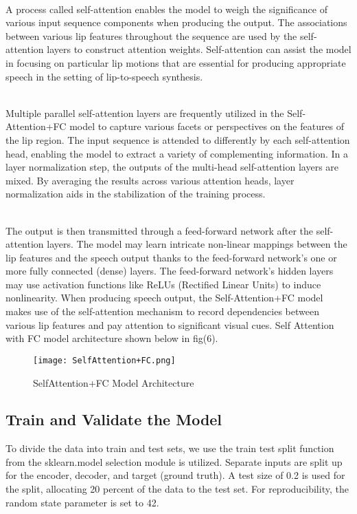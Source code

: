 \documentclass[conference]{IEEEtran}
\begin{document}
\\ A process called self-attention enables the model to weigh the significance of various input sequence components when producing the output.
The associations between various lip features throughout the sequence are used by the self-attention layers to construct attention weights. Self-attention can assist the model in focusing on particular lip motions that are essential for producing appropriate speech in the setting of lip-to-speech synthesis.

\\ Multiple parallel self-attention layers are frequently utilized in the Self-Attention+FC model to capture various facets or perspectives on the features of the lip region. The input sequence is attended to differently by each self-attention head, enabling the model to extract a variety of complementing information. In a layer normalization step, the outputs of the multi-head self-attention layers are mixed. By averaging the results across various attention heads, layer normalization aids in the stabilization of the training process.

\\ The output is then transmitted through a feed-forward network after the self-attention layers. The model may learn intricate non-linear mappings between the lip features and the speech output thanks to the feed-forward network's one or more fully connected (dense) layers. The feed-forward network's hidden layers may use activation functions like ReLUs (Rectified Linear Units) to induce nonlinearity. When producing speech output, the Self-Attention+FC model makes use of the self-attention mechanism to record dependencies between various lip features and pay attention to significant visual cues. Self Attention with FC model architecture shown below in fig(6).

\begin{figure}[htbp]
\centerline{\texttt{[image: SelfAttention+FC.png]}}
\caption{SelfAttention+FC Model Architecture}
\label{fig}
\end{figure}
\subsection{Train and Validate the Model}
To divide the data into train and test sets, we use the train test split function from the sklearn.model selection module is utilized.
Separate inputs are split up for the encoder, decoder, and target (ground truth). A test size of 0.2 is used for the split, allocating 20 percent of the data to the test set. For reproducibility, the random state parameter is set to 42.
\end{document}
